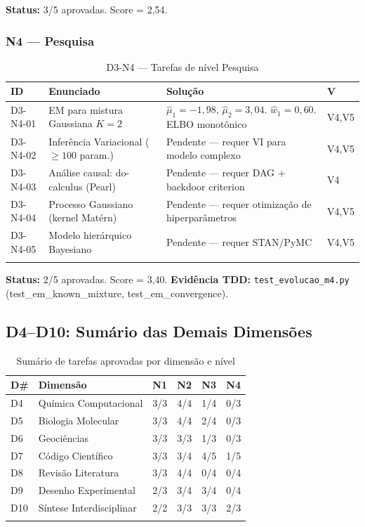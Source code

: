 \documentclass[12pt,a4paper,oneside]{article}
\begin{document}
\textbf{Status:} 3/5 aprovadas. Score = 2,54.

\subsubsection{N4 — Pesquisa}

\begin{longtable}{p{}p{}p{}p{}}
\toprule
\textbf{ID} & \textbf{Enunciado} & \textbf{Solução} & \textbf{V} \\
\midrule
D3-N4-01 & EM para mistura Gaussiana $K=2$ & $\hat{\mu}_1=-1{,}98$, $\hat{\mu}_2=3{,}04$. $\hat{w}_1=0{,}60$. ELBO monotônico & V4,V5 \\
D3-N4-02 & Inferência Variacional ($\geq 100$ param.) & Pendente — requer VI para modelo complexo & V4,V5 \\
D3-N4-03 & Análise causal: do-calculus (Pearl) & Pendente — requer DAG + backdoor criterion & V4 \\
D3-N4-04 & Processo Gaussiano (kernel Matérn) & Pendente — requer otimização de hiperparâmetros & V4,V5 \\
D3-N4-05 & Modelo hierárquico Bayesiano & Pendente — requer STAN/PyMC & V4,V5 \\
\bottomrule
\caption{D3-N4 — Tarefas de nível Pesquisa}
\end{longtable}

\textbf{Status:} 2/5 aprovadas. Score = 3,40. \textbf{Evidência TDD:}
\texttt{test\_evolucao\_m4.py} (test\_em\_known\_mixture, test\_em\_convergence).


\subsection{D4--D10: Sumário das Demais Dimensões}

\begin{longtable}{p{}p{}p{}p{}p{}p{}}
\toprule
\textbf{D\#} & \textbf{Dimensão} & \textbf{N1} & \textbf{N2} & \textbf{N3} & \textbf{N4} \\
\midrule
D4 & Química Computacional & 3/3 & 4/4 & 1/4 & 0/3 \\
D5 & Biologia Molecular & 3/3 & 4/4 & 2/4 & 0/3 \\
D6 & Geociências & 3/3 & 3/3 & 1/3 & 0/3 \\
D7 & Código Científico & 3/3 & 3/4 & 4/5 & 1/5 \\
D8 & Revisão Literatura & 3/3 & 4/4 & 0/4 & 0/4 \\
D9 & Desenho Experimental & 2/3 & 3/4 & 3/4 & 0/4 \\
D10 & Síntese Interdisciplinar & 2/2 & 3/3 & 3/3 & 2/3 \\
\bottomrule
\caption{Sumário de tarefas aprovadas por dimensão e nível}
\end{longtable}
\end{document}
